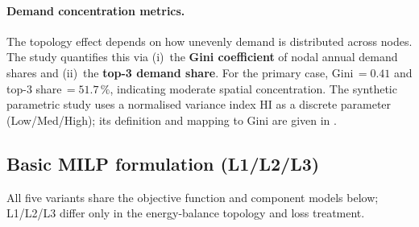 \documentclass[a4paper,fleqn]{cas-dc}
\begin{document}
\paragraph{Demand concentration metrics.}
The topology effect depends on how unevenly demand is distributed
across nodes. The study quantifies this via (i)~the \textbf{Gini
coefficient} of nodal annual demand shares and (ii)~the
\textbf{top-3 demand share}. For the primary
case, Gini\,$= 0.41$ and top-3 share\,$= 51.7\,\%$, indicating
moderate spatial concentration. The synthetic parametric study uses a
normalised variance index HI as a discrete parameter
(Low/Med/High); its definition and mapping to Gini are given in
.

\subsection{Basic MILP formulation (L1/L2/L3)}
\label{sec:milp}

All five variants share the objective function and component models
below; L1/L2/L3 differ only in the energy-balance topology and
loss treatment.
\end{document}
